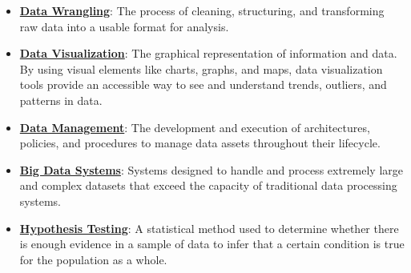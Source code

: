 \documentclass{article}%
\begin{document}
\begin{itemize}[leftmargin=*]
\item \href{https://purdue.brightspace.com/d2l/common/assets/pdfjs-d2l-dist/1.0.14-legacy/web/viewer.html?file=\%2Fcontent\%2Fenforced\%2F1095465-WL.202510.CS24200.LE1\%2F01L1-introduction.pdf\%3Fou\%3D1095465\&lang=en-us\&container=d2l-fileviewer-rendered-pdf\&fullscreen=d2l-fileviewer-rendered-pdf-dialog\&height=667#page=4}{\textbf{Data Wrangling}}: The process of cleaning, structuring, and transforming raw data into a usable format for analysis.%
\item \href{https://purdue.brightspace.com/d2l/common/assets/pdfjs-d2l-dist/1.0.14-legacy/web/viewer.html?file=\%2Fcontent\%2Fenforced\%2F1095465-WL.202510.CS24200.LE1\%2F01L1-introduction.pdf\%3Fou\%3D1095465\&lang=en-us\&container=d2l-fileviewer-rendered-pdf\&fullscreen=d2l-fileviewer-rendered-pdf-dialog\&height=667#page=4}{\textbf{Data Visualization}}: The graphical representation of information and data. By using visual elements like charts, graphs, and maps, data visualization tools provide an accessible way to see and understand trends, outliers, and patterns in data.%
\item \href{https://purdue.brightspace.com/d2l/common/assets/pdfjs-d2l-dist/1.0.14-legacy/web/viewer.html?file=\%2Fcontent\%2Fenforced\%2F1095465-WL.202510.CS24200.LE1\%2F01L1-introduction.pdf\%3Fou\%3D1095465\&lang=en-us\&container=d2l-fileviewer-rendered-pdf\&fullscreen=d2l-fileviewer-rendered-pdf-dialog\&height=667#page=4}{\textbf{Data Management}}: The development and execution of architectures, policies, and procedures to manage data assets throughout their lifecycle.%
\item \href{https://purdue.brightspace.com/d2l/common/assets/pdfjs-d2l-dist/1.0.14-legacy/web/viewer.html?file=\%2Fcontent\%2Fenforced\%2F1095465-WL.202510.CS24200.LE1\%2F01L1-introduction.pdf\%3Fou\%3D1095465\&lang=en-us\&container=d2l-fileviewer-rendered-pdf\&fullscreen=d2l-fileviewer-rendered-pdf-dialog\&height=667#page=4}{\textbf{Big Data Systems}}: Systems designed to handle and process extremely large and complex datasets that exceed the capacity of traditional data processing systems.%
\item \href{https://purdue.brightspace.com/d2l/common/assets/pdfjs-d2l-dist/1.0.14-legacy/web/viewer.html?file=\%2Fcontent\%2Fenforced\%2F1095465-WL.202510.CS24200.LE1\%2F01L1-introduction.pdf\%3Fou\%3D1095465\&lang=en-us\&container=d2l-fileviewer-rendered-pdf\&fullscreen=d2l-fileviewer-rendered-pdf-dialog\&height=667#page=4}{\textbf{Hypothesis Testing}}: A statistical method used to determine whether there is enough evidence in a sample of data to infer that a certain condition is true for the population as a whole.%

\end{itemize}
\end{document}
